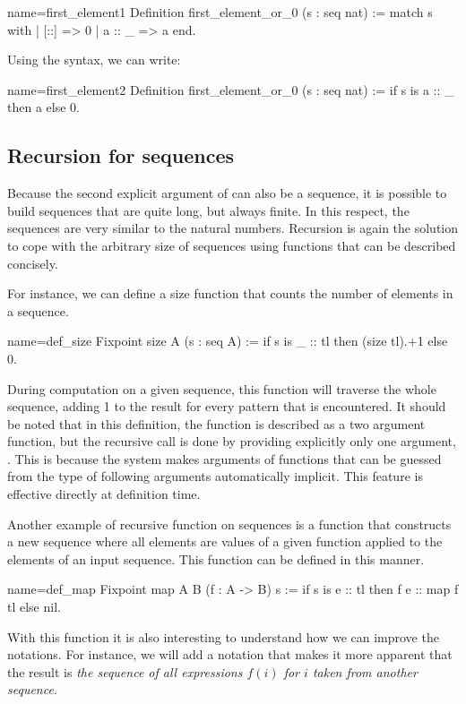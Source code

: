 \begin{coq}{name=first_element1}{}
Definition first_element_or_0 (s : seq nat) :=
  match s with
  | [::] => 0
  | a :: _ => a
  end.
\end{coq}
Using the  syntax, we can write:

\begin{coq}{name=first_element2}{}
Definition first_element_or_0 (s : seq nat) :=
  if s is a :: _ then a else 0.
\end{coq}
\subsection{Recursion for sequences}
Because the second explicit argument of  can also be a sequence, it is
possible to build sequences that are quite long, but always finite.
In this respect, the sequences are very similar to the natural
numbers.  Recursion is again the solution to cope with the arbitrary
size of sequences using functions that can be described concisely.

For instance, we can define a size function that counts the number of
elements in a sequence.

\begin{coq}{name=def_size}{}
Fixpoint size A (s : seq A) :=
  if s is _ :: tl then (size tl).+1 else 0.
\end{coq}
During computation on a given sequence, this function will traverse
the whole sequence, adding 1 to the result for every
 pattern that is encountered.  It should be noted that in this
definition, the function  is described as a two argument
function, but the recursive call  is done by providing
explicitly only one argument, .  This is because
the \Coq{} system makes
arguments of functions that can be guessed from the type of following
arguments automatically implicit.  This feature is effective directly
at definition time.

Another example of recursive function on sequences is a function that constructs
a new sequence where all elements are values of a given function applied to
the elements of an input sequence.  This function can be defined in this
manner.

\begin{coq}{name=def_map}{}
Fixpoint map A B (f : A -> B) s :=
  if s is e :: tl then f e :: map f tl else nil.
\end{coq}
With this function it is also interesting to understand how we can
improve the notations.  For instance, we will add a notation that
makes it more apparent that the result is {\em the sequence of all
expressions \(f(i)\) for \(i\) taken from another sequence}.

